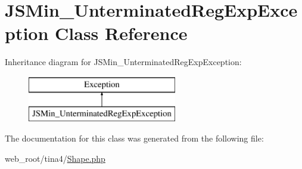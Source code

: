 \hypertarget{classJSMin__UnterminatedRegExpException}{}\section{J\+S\+Min\+\_\+\+Unterminated\+Reg\+Exp\+Exception Class Reference}
\label{classJSMin__UnterminatedRegExpException}
Inheritance diagram for J\+S\+Min\+\_\+\+Unterminated\+Reg\+Exp\+Exception\+:\begin{figure}[H]
\begin{center}
\leavevmode
\includegraphics[height=2.000000cm]{classJSMin__UnterminatedRegExpException}
\end{center}
\end{figure}


The documentation for this class was generated from the following file\+:\begin{DoxyCompactItemize}
\item 
web\+\_\+root/tina4/\hyperlink{Shape_8php}{Shape.\+php}\end{DoxyCompactItemize}
